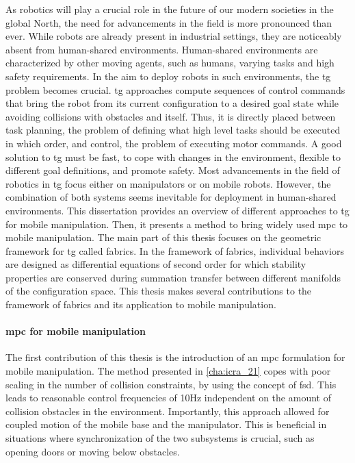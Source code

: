 
As robotics will play a crucial role in the future of our
modern societies in the global North, the need for
advancements in the field is more pronounced than ever.
While robots are already present in industrial settings,
they are noticeably absent from human-shared environments.
Human-shared environments are characterized by other moving agents, 
such as humans, varying tasks and high safety requirements.
In the aim to deploy robots in such environments, the
\ac{tg} problem becomes crucial. \Ac{tg} approaches compute sequences
of control commands that bring the robot from its current
configuration to a desired goal state while avoiding
collisions with obstacles and itself. Thus, it is directly placed between 
task planning, the problem of defining what high level tasks should be executed
in which order, and control, the problem of executing motor commands.
A good solution to \ac{tg} must be fast, to cope with changes in the
environment, flexible to different goal definitions, and promote safety.
Most advancements in the field of robotics in \ac{tg} focus either on
manipulators or on mobile robots. However, the combination of both
systems seems inevitable for deployment in human-shared environments.
This dissertation provides an overview of different approaches to \ac{tg} for
mobile manipulation. Then, it presents a method to bring widely used \ac{mpc}
to mobile manipulation. The main part of this thesis focuses on the geometric
framework for \ac{tg} called \ac{fabrics}. In the framework of \ac{fabrics},
individual behaviors are designed as differential equations of second order
for which stability properties are conserved during summation transfer between
different manifolds of the configuration space. This thesis makes several
contributions to the framework of \ac{fabrics} and its application to mobile
manipulation.

\paragraph{\acf{mpc} for mobile manipulation}
The first contribution of this thesis is the introduction of an \ac{mpc}
formulation for mobile manipulation. The method presented in \cref{cha:icra_21}
copes with poor scaling in the number of collision constraints, by using the
concept of \ac{fsd}. This leads to reasonable control frequencies of 10Hz
independent on the amount of collision obstacles in the environment.
Importantly, this approach allowed for coupled motion of the mobile base and the
manipulator. This is beneficial in situations where synchronization of the two
subsystems is crucial, such as opening doors or moving below obstacles. 

